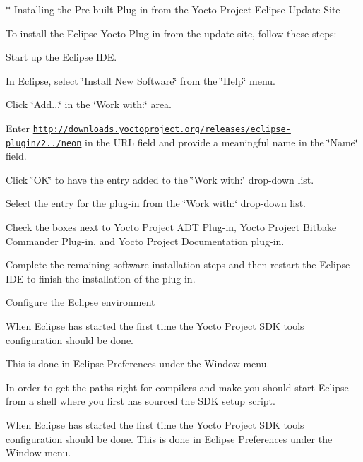 \begin{DoxyItemize}
\begin{DoxyItemize}
\begin{DoxyItemize}
$\ast$ Installing the Pre-\/built Plug-\/in from the Yocto Project Eclipse Update Site
\end{DoxyItemize}
\item To install the Eclipse Yocto Plug-\/in from the update site, follow these steps\+:
\begin{DoxyItemize}
\item Start up the Eclipse I\+DE.
\item In Eclipse, select \char`\"{}\+Install New Software\char`\"{} from the \char`\"{}\+Help\char`\"{} menu.
\item Click \char`\"{}\+Add...\char`\"{} in the \char`\"{}\+Work with\+:\char`\"{} area.
\item Enter \href{http://downloads.yoctoproject.org/releases/eclipse-plugin/2.3.2/neon}{\tt http\+://downloads.\+yoctoproject.\+org/releases/eclipse-\/plugin/2../neon} in the U\+RL field and provide a meaningful name in the \char`\"{}\+Name\char`\"{} field.
\item Click \char`\"{}\+O\+K\char`\"{} to have the entry added to the \char`\"{}\+Work with\+:\char`\"{} drop-\/down list.
\item Select the entry for the plug-\/in from the \char`\"{}\+Work with\+:\char`\"{} drop-\/down list.
\item Check the boxes next to Yocto Project A\+DT Plug-\/in, Yocto Project Bitbake Commander Plug-\/in, and Yocto Project Documentation plug-\/in.
\item Complete the remaining software installation steps and then restart the Eclipse I\+DE to finish the installation of the plug-\/in.
\end{DoxyItemize}
\end{DoxyItemize}
\item Configure the Eclipse environment
\begin{DoxyItemize}
\item When Eclipse has started the first time the Yocto Project S\+DK tools configuration should be done.
\item This is done in Eclipse Preferences under the Window menu.
\item In order to get the paths right for compilers and make you should start Eclipse from a shell where you first has sourced the S\+DK setup script.
\item When Eclipse has started the first time the Yocto Project S\+DK tools configuration should be done. This is done in Eclipse Preferences under the Window menu. ~\newline
 
\end{DoxyItemize}
\end{DoxyItemize}

